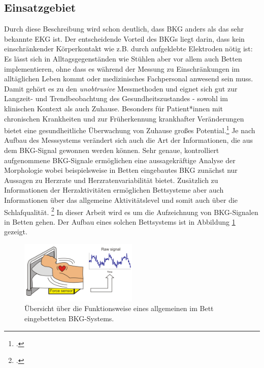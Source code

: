 	\subsection{Einsatzgebiet}
	
	Durch diese Beschreibung wird schon deutlich, dass \ac{BKG} anders als das sehr bekannte \ac{EKG} ist. Der entscheidende Vorteil des \ac{BKG}s liegt darin, dass kein einschränkender Körperkontakt wie z.B. durch aufgeklebte Elektroden nötig ist: Es lässt sich in Alltagsgegenständen wie Stühlen aber vor allem auch Betten implementieren, ohne dass es während der Messung zu Einschränkungen im alltäglichen Leben kommt oder medizinisches Fachpersonal anwesend sein muss. Damit gehört es zu den \textit{unobtrusive} Messmethoden und eignet sich gut zur Langzeit- und Trendbeobachtung des Gesundheitszustandes - sowohl im klinischen Kontext als auch Zuhause. Besonders für Patient*innen mit chronischen Krankheiten und zur Früherkennung krankhafter Veränderungen bietet eine gesundheitliche Überwachung von Zuhause großes Potential.\footcite[Vgl.][]{Inan2015} Je nach Aufbau des Messsystems verändert sich auch die Art der Informationen, die aus dem \ac{BKG}-Signal gewonnen werden können. Sehr genaue, kontrolliert aufgenommene \ac{BKG}-Signale ermöglichen eine aussagekräftige Analyse der Morphologie wobei beispielsweise in Betten eingebautes \ac{BKG} zunächst nur Aussagen zu Herzrate und Herzratenvariabilität bietet. Zusätzlich zu Informationen der Herzaktivitäten ermöglichen Bettsysteme aber auch Informationen über das allgemeine Aktivitätslevel und somit auch über die Schlafqualität. \footcite[Vgl.][]{Bruser2011} In dieser Arbeit wird es um die Aufzeichnung von \ac{BKG}-Signalen in Betten gehen. Der Aufbau eines solchen Bettsystems ist in Abbildung \ref{fig:bcgbed} gezeigt.
	
	 \begin{figure}[H]
	 	\centering
		\includegraphics[width=0.5\textwidth]{pic/bcgBed.png}
		\caption[Übersicht über die Funktionsweise eines allgemeinen im Bett eingebetteten \ac{BKG}-Systems]{Übersicht über die Funktionsweise eines allgemeinen im Bett eingebetteten \ac{BKG}-Systems.\protect\footnotemark}
		\label{fig:bcgbed}
	\end{figure}
	
